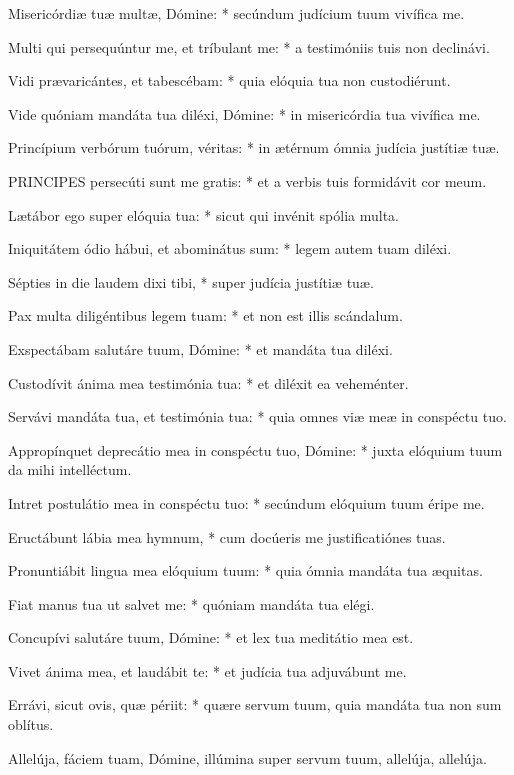 Misericórdiæ tuæ multæ, Dómine: * secúndum judícium tuum vivífica me.

Multi qui persequúntur me, et tríbulant me: * a testimóniis tuis non declinávi.

Vidi prævaricántes, et tabescébam: * quia elóquia tua non custodiérunt.

Vide quóniam mandáta tua diléxi, Dómine: * in misericórdia tua vivífica me.

Princípium verbórum tuórum, véritas: * in ætérnum ómnia judícia justítiæ tuæ.


\lettrine[lines=2]{P}{RINCIPES} persecúti sunt me gratis: * et a verbis tuis formidávit cor meum.

Lætábor ego super elóquia tua: * sicut qui invénit spólia multa.

Iniquitátem ódio hábui, et abominátus sum: * legem autem tuam diléxi.

Sépties in die laudem dixi tibi, * super judícia justítiæ tuæ.

Pax multa diligéntibus legem tuam: * et non est illis scándalum.

Exspectábam salutáre tuum, Dómine: * et mandáta tua diléxi.

Custodívit ánima mea testimónia tua: * et diléxit ea veheménter.

Servávi mandáta tua, et testimónia tua: * quia omnes viæ meæ in conspéctu tuo.

Appropínquet deprecátio mea in conspéctu tuo, Dómine: * juxta elóquium tuum da mihi intelléctum.

Intret postulátio mea in conspéctu tuo: * secúndum elóquium tuum éripe me.

Eructábunt lábia mea hymnum, * cum docúeris me justificatiónes tuas.

Pronuntiábit lingua mea elóquium tuum: * quia ómnia mandáta tua æquitas.

Fiat manus tua ut salvet me: * quóniam mandáta tua elégi.

Concupívi salutáre tuum, Dómine: * et lex tua meditátio mea est.

Vivet ánima mea, et laudábit te: * et judícia tua adjuvábunt me.

Errávi, sicut ovis, quæ périit: * quære servum tuum, quia mandáta tua non sum oblítus.

 Allelúja, fáciem tuam, Dómine, illúmina super servum tuum, allelúja, allelúja.


